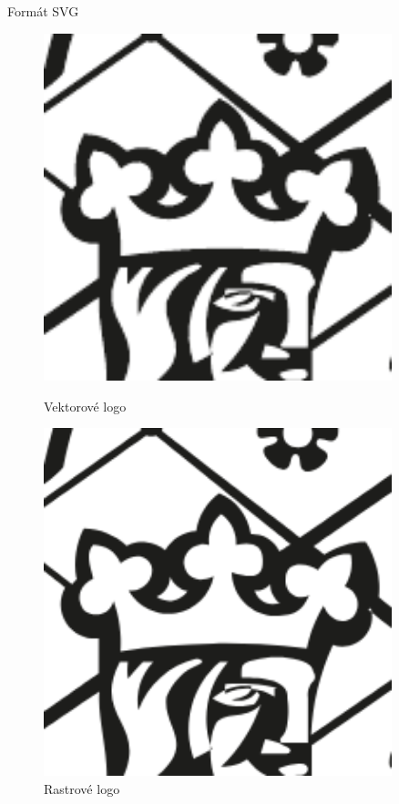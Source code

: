 \begin{frame}[t,fragile]{Formát SVG}
    \begin{figure}[!htb]
        \centering
        \begin{minipage}{.5\textwidth}
            \centering
            \includegraphics[width=0.9\textwidth]{image/logo-zoom.pdf}
            \caption{Vektorové logo}
            \label{fig:prob1_6_2}
        \end{minipage}%
        \begin{minipage}{.5\textwidth}
            \centering
            \includegraphics[width=0.9\textwidth]{image/logo-zoom.png}
            \caption{Rastrové logo}
            \label{fig:prob1_6_1}
        \end{minipage}
    \end{figure}
\end{frame}

